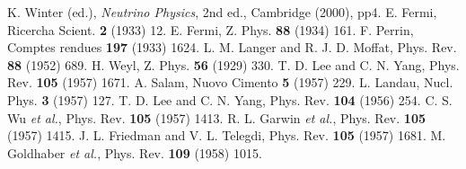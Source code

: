 \begin{thebibliography}{99}
K. Winter (ed.), \emph{Neutrino Physics}, 2nd ed.,
  Cambridge (2000), pp4.
E. Fermi, Ricercha Scient. \textbf{2} (1933) 12.
E. Fermi, Z. Phys. \textbf{88} (1934) 161.
F. Perrin, Comptes rendues \textbf{197} (1933) 1624.
L. M. Langer and R. J. D. Moffat, Phys. Rev.
  \textbf{88} (1952) 689.
H. Weyl, Z. Phys. \textbf{56} (1929) 330.
T. D. Lee and C. N. Yang, Phys. Rev. \textbf{105}
  (1957) 1671.
A. Salam, Nuovo Cimento \textbf{5} (1957) 229.
L. Landau, Nucl. Phys. \textbf{3} (1957) 127.
T. D. Lee and C. N. Yang, Phys. Rev. \textbf{104}
  (1956) 254.
C. S. Wu \textit{et al.}, Phys. Rev. \textbf{105} (1957)
  1413.
R. L. Garwin \textit{et al.}, Phys. Rev. \textbf{105}
  (1957) 1415.
J. L. Friedman and V. L. Telegdi, Phys. Rev.
  \textbf{105} (1957) 1681.
M. Goldhaber \textit{et al.}, Phys. Rev.  \textbf{109}
  (1958) 1015.
\end{thebibliography}


